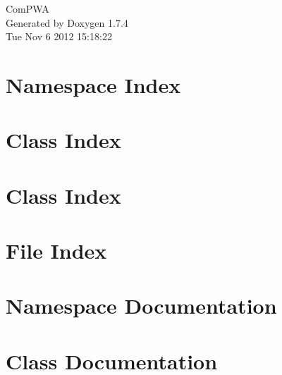 \documentclass[a4paper]{book}
\begin{document}
\hypersetup{pageanchor=false}
\begin{titlepage}
\vspace*{7cm}
\begin{center}
{\Large ComPWA }\\
\vspace*{1cm}
{\large Generated by Doxygen 1.7.4}\\
\vspace*{0.5cm}
{\small Tue Nov 6 2012 15:18:22}\\
\end{center}
\end{titlepage}
\clearemptydoublepage
{}
\tableofcontents
\clearemptydoublepage
{}
\hypersetup{pageanchor=true}
\chapter{Namespace Index}

\chapter{Class Index}

\chapter{Class Index}

\chapter{File Index}

\chapter{Namespace Documentation}




\chapter{Class Documentation}


















\end{document}
